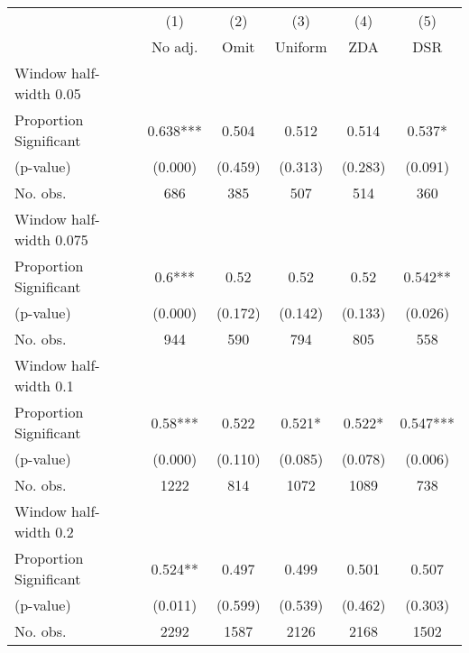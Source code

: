 
\def\sym#1{\ifmmode^{#1}\else\(^{#1}\)\fi}
\begin{tabular}{l*{5}{c}}
\hline\hline
& \multicolumn{1}{c}{(1)} &  \multicolumn{1}{c}{(2)} &  \multicolumn{1}{c}{(3)} &  \multicolumn{1}{c}{(4)} &  \multicolumn{1}{c}{(5)}\\
& \multicolumn{1}{c}{No adj.} &  \multicolumn{1}{c}{Omit} &  \multicolumn{1}{c}{Uniform} &  \multicolumn{1}{c}{ZDA} &  \multicolumn{1}{c}{DSR}\\

\hline
\hline
Window half-width 0.05\\

Proportion Significant& 0.638*** &  0.504 &  0.512 &  0.514 &  0.537*\\

(p-value) & (0.000) &  (0.459) &  (0.313) &  (0.283) &  (0.091)\\

No. obs.& 686 &  385 &  507 &  514 &  360\\

\hline
Window half-width 0.075\\

Proportion Significant& 0.6*** &  0.52 &  0.52 &  0.52 &  0.542**\\

(p-value) & (0.000) &  (0.172) &  (0.142) &  (0.133) &  (0.026)\\

No. obs.& 944 &  590 &  794 &  805 &  558\\

\hline
Window half-width 0.1\\

Proportion Significant& 0.58*** &  0.522 &  0.521* &  0.522* &  0.547***\\

(p-value) & (0.000) &  (0.110) &  (0.085) &  (0.078) &  (0.006)\\

No. obs.& 1222 &  814 &  1072 &  1089 &  738\\

\hline
Window half-width 0.2\\

Proportion Significant& 0.524** &  0.497 &  0.499 &  0.501 &  0.507\\

(p-value) & (0.011) &  (0.599) &  (0.539) &  (0.462) &  (0.303)\\

No. obs.& 2292 &  1587 &  2126 &  2168 &  1502\\


\end{tabular}
